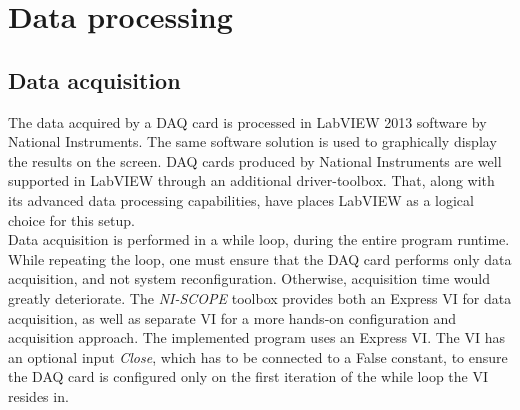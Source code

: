 \documentclass{standalone}
\begin{document}
\chapter{Data processing} \label{ch:data_processing}
\setcounter{page}\thestranica


\section{Data acquisition}

The data acquired by a DAQ card is processed in LabVIEW 2013 software by National Instruments. The same software solution is used to graphically display the results on the screen. DAQ cards produced by National Instruments are well supported in LabVIEW through an additional driver-toolbox. That, along with its advanced data processing capabilities, have places LabVIEW as a logical choice for this setup. \\

Data acquisition is performed in a while loop, during the entire program runtime. While repeating the loop, one must ensure that the DAQ card performs only data acquisition, and not system reconfiguration. Otherwise, acquisition time would greatly deteriorate. The \textit{NI-SCOPE} toolbox provides both an Express VI for data acquisition, as well as separate VI for a more hands-on configuration and acquisition approach. The implemented program uses an Express VI. The VI has an optional input \textit{Close}, which has to be connected to a False constant, to ensure the DAQ card is configured only on the first iteration of the while loop the VI resides in. \\
\end{document}
